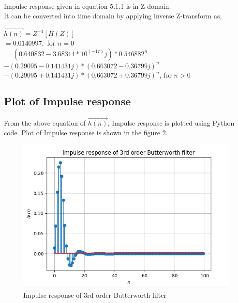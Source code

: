 \documentclass[journal,10pt,twocolumn]{article}
\begin{document}
\begin{flushleft}
Impulse response given in equation 5.1.1 is in Z domain.\\
It can be converted into time domain by applying inverse Z-transform as,\\
\begin{flushleft}
    
$\vec{h(n)} = Z^{-1}[H(Z)]$\\
\vspace{0.2cm}
$= 0.0140997,$ for $n=0 $\\
\vspace{0.2cm}
$= (0.640832 - 3.68314*10^{(-17)}j) * 0.546882^n $\\
 $ -(0.29095 - 0.141431j) * (0.663072 - 0.36799j)^n$ \\
 $ -(0.29095 + 0.141431j) *(0.663072 + 0.36799j)^n$, for $n>0$   
\end{flushleft}

\subsection{Plot of Impulse response}
\vspace{0.2cm}
From the above equation of $\vec{h(n)}$, Impulse response is plotted using Python code. Plot of Impulse response is shown in the figure 2.\\
\begin{figure}[h]
\includegraphics[width=1\columnwidth]{impulse.png}
\caption{Impulse response of 3rd order Butterworth filter}
\label{fig:Impulse response of 3rd order Butterworth filter}
\end{figure}


\end{flushleft}
\end{document}
